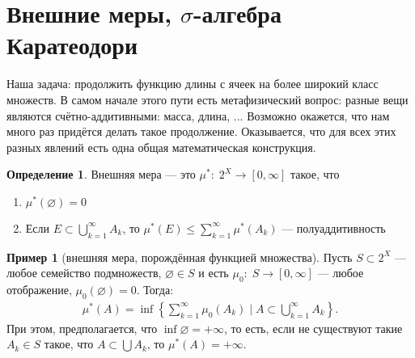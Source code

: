 \documentclass[a4paper,14pt]{extarticle}
\newcounter{theoremCnt}
\theoremstyle{definition}
\newtheorem{df}[theoremCnt]{Определение}
\theoremstyle{plain}
\theoremstyle{plain}
\theoremstyle{plain}
\theoremstyle{plain}
\theoremstyle{definition}
\newtheorem{exmpl}[theoremCnt]{Пример}
\theoremstyle{definition}
\theoremstyle{definition}
\theoremstyle{definition}
\theoremstyle{definition}
\theoremstyle{definition}
\theoremstyle{plain}
\theoremstyle{plain}
\theoremstyle{plain}
\theoremstyle{plain}
\theoremstyle{definition}
\theoremstyle{definition}
\theoremstyle{definition}
\theoremstyle{definition}
\theoremstyle{definition}
\begin{document}

\section{Внешние меры, $ \sigma $-алгебра Каратеодори}

Наша задача: продолжить функцию длины с ячеек на более широкий класс множеств. В самом начале этого пути есть метафизический вопрос: разные вещи являются счётно-аддитивными: масса, длина, ... Возможно окажется, что нам много раз придётся делать такое продолжение. Оказывается, что для всех этих разных явлений есть одна общая математическая конструкция.

\begin{df}
 Внешняя мера --- это $ \mu^\ast \colon\; 2^X \to [0, \infty] $ такое, что
 \begin{enumerate}
  \item $ \mu^\ast(\varnothing) = 0 $
  \item Если $ E \subset \displaystyle \bigcup_{k=1}^\infty A_k $, то $ \displaystyle \mu^\ast\left( E \right) \leqslant \sum_{k=1}^\infty \mu^\ast(A_k) $ --- полуаддитивность
 \end{enumerate}
\end{df}
\begin{exmpl}[внешняя мера, порождённая функцией множества]
 Пусть $ S \subset 2^X $ --- любое семейство подмножеств, $ \varnothing \in S $ и есть $ \mu_0 \colon\; S \to [0, \infty] $ --- любое отображение, $ \mu_0(\varnothing) = 0 $. Тогда:
 \begin{align*}
  \mu^\ast(A) = \inf \left\{ \sum_{k=1}^\infty \mu_0(A_k) \mid A \subset \bigcup_{k=1}^\infty A_k  \right\}
 .\end{align*} При этом, предполагается, что $ \inf \varnothing = +\infty $, то есть, если не существуют такие $ A_k \in S $ такое, что $ A \subset \bigcup A_k $, то $ \mu^\ast (A) = +\infty $.
\end{exmpl}
\end{document}
